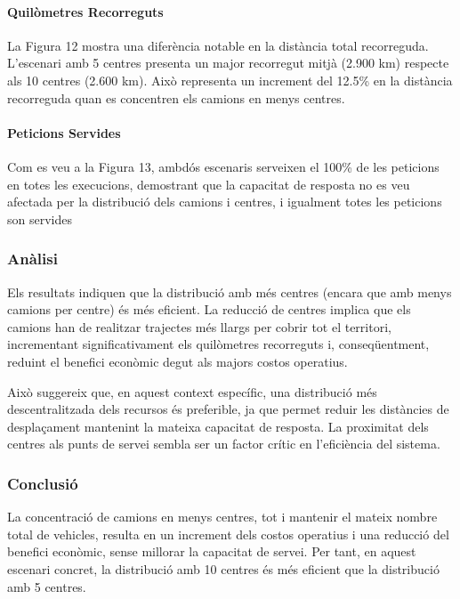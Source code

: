 \paragraph{Quilòmetres Recorreguts}

La Figura 12 mostra una diferència notable en la distància total recorreguda. L'escenari amb 5 centres presenta un major recorregut mitjà (2.900 km) respecte als 10 centres (2.600 km). Això representa un increment del 12.5\% en la distància recorreguda quan es concentren els camions en menys centres.


\paragraph{Peticions Servides}
Com es veu a la Figura 13, ambdós escenaris serveixen el 100\% de les peticions en totes les execucions, demostrant que la capacitat de resposta no es veu afectada per la distribució dels camions i centres, i igualment totes les peticions son servides


\subsubsection{Anàlisi}
Els resultats indiquen que la distribució amb més centres (encara que amb menys camions per centre) és més eficient. La reducció de centres implica que els camions han de realitzar trajectes més llargs per cobrir tot el territori, incrementant significativament els quilòmetres recorreguts i, conseqüentment, reduint el benefici econòmic degut als majors costos operatius.

Això suggereix que, en aquest context específic, una distribució més descentralitzada dels recursos és preferible, ja que permet reduir les distàncies de desplaçament mantenint la mateixa capacitat de resposta. La proximitat dels centres als punts de servei sembla ser un factor crític en l'eficiència del sistema.

\subsubsection{Conclusió}
La concentració de camions en menys centres, tot i mantenir el mateix nombre total de vehicles, resulta en un increment dels costos operatius i una reducció del benefici econòmic, sense millorar la capacitat de servei. Per tant, en aquest escenari concret, la distribució amb 10 centres és més eficient que la distribució amb 5 centres.

